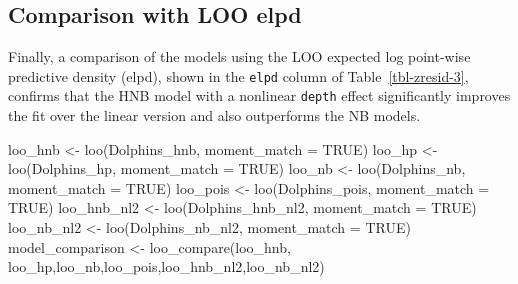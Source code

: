 \documentclass[
  english,
  letterpaper,
  DIV=11,
  numbers=noendperiod]{scrartcl}
\newenvironment{Shaded}{\begin{snugshade}}{\end{snugshade}}
\newcommand{\AttributeTok}[1]{\textcolor[rgb]{0.40,0.45,0.13}{#1}}
\newcommand{\ConstantTok}[1]{\textcolor[rgb]{0.56,0.35,0.01}{#1}}
\newcommand{\FunctionTok}[1]{\textcolor[rgb]{0.28,0.35,0.67}{#1}}
\newcommand{\NormalTok}[1]{\textcolor[rgb]{0.00,0.23,0.31}{#1}}
\newcommand{\OtherTok}[1]{\textcolor[rgb]{0.00,0.23,0.31}{#1}}
\begin{document}
\subsection{Comparison with LOO elpd}\label{comparison-with-loo-elpd}

Finally, a comparison of the models using the LOO expected log
point-wise predictive density (elpd), shown in the \texttt{elpd} column
of Table~\ref{tbl-zresid-3}, confirms that the HNB model with a
nonlinear \texttt{depth} effect significantly improves the fit over the
linear version and also outperforms the NB models.

\begin{Shaded}
\begin{Highlighting}[]
\NormalTok{loo\_hnb  }\OtherTok{\textless{}{-}} \FunctionTok{loo}\NormalTok{(Dolphins\_hnb,  }\AttributeTok{moment\_match =} \ConstantTok{TRUE}\NormalTok{)}
\NormalTok{loo\_hp   }\OtherTok{\textless{}{-}} \FunctionTok{loo}\NormalTok{(Dolphins\_hp,   }\AttributeTok{moment\_match =} \ConstantTok{TRUE}\NormalTok{)}
\NormalTok{loo\_nb   }\OtherTok{\textless{}{-}} \FunctionTok{loo}\NormalTok{(Dolphins\_nb,   }\AttributeTok{moment\_match =} \ConstantTok{TRUE}\NormalTok{)}
\NormalTok{loo\_pois }\OtherTok{\textless{}{-}} \FunctionTok{loo}\NormalTok{(Dolphins\_pois, }\AttributeTok{moment\_match =} \ConstantTok{TRUE}\NormalTok{)}
\NormalTok{loo\_hnb\_nl2 }\OtherTok{\textless{}{-}} \FunctionTok{loo}\NormalTok{(Dolphins\_hnb\_nl2, }\AttributeTok{moment\_match =} \ConstantTok{TRUE}\NormalTok{)}
\NormalTok{loo\_nb\_nl2  }\OtherTok{\textless{}{-}} \FunctionTok{loo}\NormalTok{(Dolphins\_nb\_nl2,  }\AttributeTok{moment\_match =} \ConstantTok{TRUE}\NormalTok{)}
\NormalTok{model\_comparison }\OtherTok{\textless{}{-}} \FunctionTok{loo\_compare}\NormalTok{(loo\_hnb, loo\_hp,loo\_nb,loo\_pois,loo\_hnb\_nl2,loo\_nb\_nl2)}


\end{Highlighting}
\end{Shaded}
\end{document}
